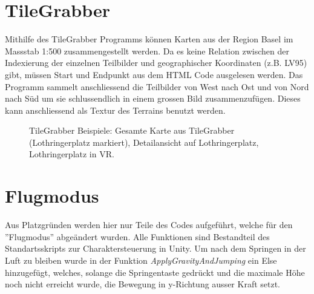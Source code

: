 \section{TileGrabber}\label{s.tilegrabber}
Mithilfe des TileGrabber Programms können Karten aus der Region Basel im Massstab 1:500 zusammengestellt werden. Da es keine Relation zwischen der Indexierung der einzelnen Teilbilder und geographischer Koordinaten (z.B. LV95) gibt, müssen Start und Endpunkt aus dem HTML Code ausgelesen werden. Das Programm sammelt anschliessend die Teilbilder von West nach Ost und von Nord nach Süd um sie schlussendlich in einem grossen Bild zusammenzufügen. Dieses kann anschliessend als Textur des Terrains benutzt werden.

\renewcommand{\baselinestretch}{1}\normalsize

\renewcommand{\baselinestretch}{1.5}\normalsize
\begin{figure}[htp]%
	\centering
	\hspace{8pt}%
	
	\hspace{48pt}%
	\hspace{8pt}%

	\caption[TileGrabber Beispiele.]
	{TileGrabber Beispiele:
		 Gesamte Karte aus TileGrabber (Lothringerplatz markiert),
		 Detailansicht auf Lothringerplatz,
		 Lothringerplatz in VR.}%
\end{figure}


\newpage
\section{Flugmodus}\label{s.flug}
Aus Platzgründen werden hier nur Teile des Codes aufgeführt, welche für den ''Flugmodus'' abgeändert wurden. Alle Funktionen sind Bestandteil des Standartsskripts zur Charaktersteuerung in Unity. 
Um nach dem Springen in der Luft zu bleiben wurde in der Funktion \textit{ApplyGravityAndJumping} ein Else hinzugefügt, welches, solange die Springentaste gedrückt und die maximale Höhe noch nicht erreicht wurde, die Bewegung in y-Richtung ausser Kraft setzt. 

\renewcommand{\baselinestretch}{1}\normalsize

\renewcommand{\baselinestretch}{1.5}\normalsize

